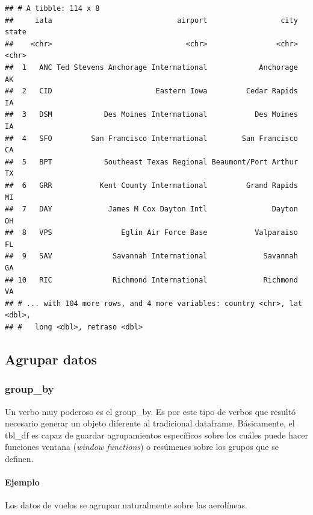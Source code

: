 \documentclass[]{article}
\newenvironment{Shaded}{\begin{snugshade}}{\end{snugshade}}
\newcommand{\KeywordTok}[1]{\textcolor[rgb]{0.13,0.29,0.53}{\textbf{#1}}}
\newcommand{\StringTok}[1]{\textcolor[rgb]{0.31,0.60,0.02}{#1}}
\newcommand{\OperatorTok}[1]{\textcolor[rgb]{0.81,0.36,0.00}{\textbf{#1}}}
\newcommand{\NormalTok}[1]{#1}
\let\oldparagraph\paragraph
\renewcommand{\paragraph}[1]{\oldparagraph{#1}\mbox{}}
\begin{document}
\begin{verbatim}
## # A tibble: 114 x 8
##     iata                             airport                 city state
##    <chr>                               <chr>                <chr> <chr>
##  1   ANC Ted Stevens Anchorage International            Anchorage    AK
##  2   CID                        Eastern Iowa         Cedar Rapids    IA
##  3   DSM            Des Moines International           Des Moines    IA
##  4   SFO         San Francisco International        San Francisco    CA
##  5   BPT            Southeast Texas Regional Beaumont/Port Arthur    TX
##  6   GRR           Kent County International         Grand Rapids    MI
##  7   DAY             James M Cox Dayton Intl               Dayton    OH
##  8   VPS                Eglin Air Force Base           Valparaiso    FL
##  9   SAV              Savannah International             Savannah    GA
## 10   RIC              Richmond International             Richmond    VA
## # ... with 104 more rows, and 4 more variables: country <chr>, lat <dbl>,
## #   long <dbl>, retraso <dbl>
\end{verbatim}

\subsection{Agrupar datos}\label{agrupar-datos}

\subsubsection{group\_by}\label{group_by}

Un verbo muy poderoso es el group\_by. Es por este tipo de verbos que
resultó necesario generar un objeto diferente al tradicional dataframe.
Básicamente, el tbl\_df es capaz de guardar agrupamientos específicos
sobre los cuáles puede hacer funciones ventana (\emph{window functions})
o resúmenes sobre los grupos que se definen.

\paragraph{Ejemplo}\label{ejemplo}

Los datos de vuelos se agrupan naturalmente sobre las aerolíneas.

\begin{Shaded}
\end{Shaded}
\end{document}
